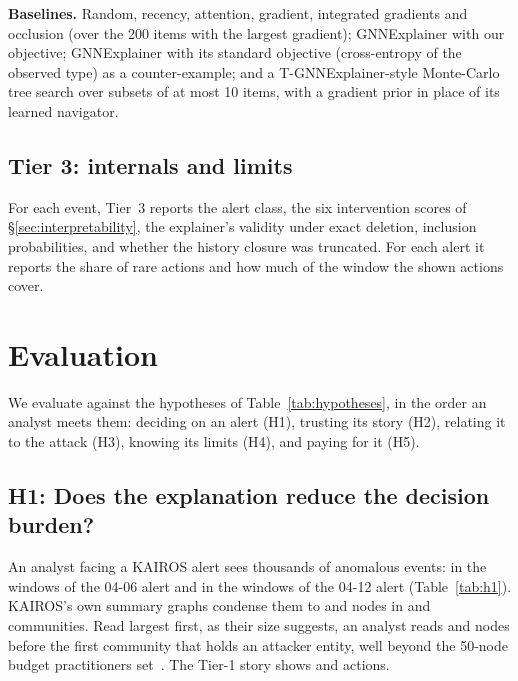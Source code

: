 \documentclass[conference]{IEEEtran}
\begin{document}
\textbf{Baselines.} Random, recency, attention, gradient, integrated gradients and occlusion (over the
200 items with the largest gradient); GNNExplainer with our objective; GNNExplainer with its standard
objective (cross-entropy of the observed type) as a counter-example; and a T-GNNExplainer-style Monte-Carlo tree search over subsets of at
most 10 items, with a gradient prior in place of its learned navigator.

\subsection{Tier 3: internals and limits}
For each event, Tier~3 reports the alert class, the six intervention scores of
\S\ref{sec:interpretability}, the explainer's validity under exact deletion, inclusion probabilities,
and whether the history closure was truncated. For each alert it reports the share of rare actions and
how much of the window the shown actions cover.

\section{Evaluation}
\label{sec:eval}
We evaluate against the hypotheses of Table~\ref{tab:hypotheses}, in the order an analyst meets them:
deciding on an alert (H1), trusting its story (H2), relating it to the attack (H3), knowing its limits
(H4), and paying for it (H5).

\subsection{H1: Does the explanation reduce the decision burden?}

An analyst facing a KAIROS alert sees thousands of anomalous events: \FlaggedEventsSix{} in the
\AlertWindowsSix{} windows of the 04-06 alert and \FlaggedEventsTwelve{} in the \AlertWindowsTwelve{}
windows of the 04-12 alert (Table~\ref{tab:h1}). KAIROS's own summary graphs condense them to
\SummaryNodesSix{} and \SummaryNodesTwelve{} nodes in \SummaryCommunitiesSix{} and
\SummaryCommunitiesTwelve{} communities. Read largest first, as their size suggests, an analyst reads
\SummaryNodesReadSix{} and \SummaryNodesReadTwelve{} nodes before the first community that holds an
attacker entity, well beyond the 50-node budget practitioners set~\cite{dong}. The Tier-1 story shows
\StoryItemsSix{} and \StoryItemsTwelve{} actions.
\end{document}
